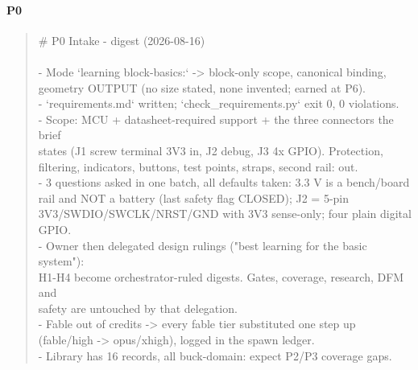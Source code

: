 \documentclass[11pt,a4paper]{article}
\begin{document}
\paragraph*{P0}
\begin{quote}\small\ttfamily\raggedright
\# P0 Intake - digest (2026-08-16)\\
~\\
- Mode `learning block-basics:` -\textgreater{} block-only scope, canonical binding,\\
  geometry OUTPUT (no size stated, none invented; earned at P6).\\
- `requirements.md` written; `check\_requirements.py` exit 0, 0 violations.\\
- Scope: MCU + datasheet-required support + the three connectors the brief\\
  states (J1 screw terminal 3V3 in, J2 debug, J3 4x GPIO). Protection,\\
  filtering, indicators, buttons, test points, straps, second rail: out.\\
- 3 questions asked in one batch, all defaults taken: 3.3 V is a bench/board\\
  rail and NOT a battery (last safety flag CLOSED); J2 = 5-pin\\
  3V3/SWDIO/SWCLK/NRST/GND with 3V3 sense-only; four plain digital GPIO.\\
- Owner then delegated design rulings ("best learning for the basic system"):\\
  H1-H4 become orchestrator-ruled digests. Gates, coverage, research, DFM and\\
  safety are untouched by that delegation.\\
- Fable out of credits -\textgreater{} every fable tier substituted one step up\\
  (fable/high -\textgreater{} opus/xhigh), logged in the spawn ledger.\\
- Library has 16 records, all buck-domain: expect P2/P3 coverage gaps.
\end{quote}
\end{document}
